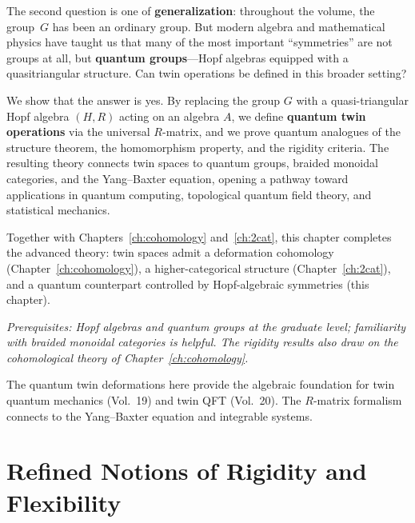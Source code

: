 \documentclass[11pt,a4paper,openany]{book}
\theoremstyle{plain}
\theoremstyle{definition}
\newcommand{\groupG}{G}
\begin{document}
The second question is one of \textbf{generalization}: throughout the volume, the group~$\groupG$ has been an ordinary group. But modern algebra and mathematical physics have taught us that many of the most important ``symmetries'' are not groups at all, but \textbf{quantum groups}---Hopf algebras equipped with a quasitriangular structure. Can twin operations be defined in this broader setting?

We show that the answer is yes. By replacing the group $\groupG$ with a quasi-triangular Hopf algebra $(H, R)$ acting on an algebra $A$, we define \textbf{quantum twin operations} via the universal $R$-matrix, and we prove quantum analogues of the structure theorem, the homomorphism property, and the rigidity criteria. The resulting theory connects twin spaces to quantum groups, braided monoidal categories, and the Yang--Baxter equation, opening a pathway toward applications in quantum computing, topological quantum field theory, and statistical mechanics.

Together with Chapters~\ref{ch:cohomology} and~\ref{ch:2cat}, this chapter completes the advanced theory: twin spaces admit a deformation cohomology (Chapter~\ref{ch:cohomology}), a higher-categorical structure (Chapter~\ref{ch:2cat}), and a quantum counterpart controlled by Hopf-algebraic symmetries (this chapter).

\textit{Prerequisites: Hopf algebras and quantum groups at the graduate level; familiarity with braided monoidal categories is helpful. The rigidity results also draw on the cohomological theory of Chapter~\ref{ch:cohomology}.}

\begin{connectionbox}
The quantum twin deformations here provide the algebraic foundation for twin quantum mechanics (Vol.~19) and twin QFT (Vol.~20). The $R$-matrix formalism connects to the Yang--Baxter equation and integrable systems.
\end{connectionbox}

\section{Refined Notions of Rigidity and Flexibility}
\end{document}
